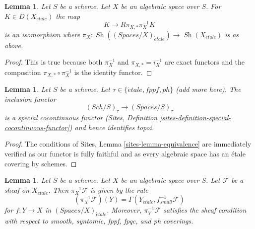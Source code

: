 \documentclass{stacks-project}
\theoremstyle{plain}
\newtheorem{lemma}[subsection]{Lemma}
\theoremstyle{definition}
\theoremstyle{remark}
\numberwithin{equation}{subsection}
\def\Sch{\mathit{Sch}}
\def\Sh{\mathop{\mathit{Sh}}\nolimits}
\def\etale{{\acute{e}tale}}
\begin{document}
\begin{lemma}
\label{lemma-cohomological-descent-etale}
Let $S$ be a scheme. Let $X$ be an algebraic space over $S$.
For $K \in D(X_\etale)$ the map
$$
K \longrightarrow R\pi_{X, *}\pi_X^{-1}K
$$
is an isomorphism where
$\pi_X : \Sh((\textit{Spaces}/X)_\etale) \to \Sh(X_\etale)$ is as above.
\end{lemma}

\begin{proof}
This is true because both $\pi_X^{-1}$ and $\pi_{X, *} = i_X^{-1}$
are exact functors and the composition $\pi_{X, *} \circ \pi_X^{-1}$
is the identity functor.
\end{proof}

\begin{lemma}
\label{lemma-compare-cohomology-other-topologies}
Let $S$ be a scheme. Let $\tau \in \{\etale, fppf, ph\}$ (add more here).
The inclusion functor
$$
(\Sch/S)_\tau \longrightarrow (\textit{Spaces}/S)_\tau
$$
is a special cocontinuous functor
(Sites, Definition \ref{sites-definition-special-cocontinuous-functor})
and hence identifies topoi.
\end{lemma}

\begin{proof}
The conditions of Sites, Lemma \ref{sites-lemma-equivalence}
are immediately verified as our functor is fully faithful
and as every algebraic space has an \'etale covering by schemes.
\end{proof}

\begin{lemma}
\label{lemma-describe-pullback}
Let $S$ be a scheme. Let $X$ be an algebraic space over $S$.
Let $\mathcal{F}$ be a sheaf on $X_\etale$. Then
$\pi_X^{-1}\mathcal{F}$ is given by the rule
$$
(\pi_X^{-1}\mathcal{F})(Y) = \Gamma(Y_\etale, f_{small}^{-1}\mathcal{F})
$$
for $f : Y \to X$ in $(\textit{Spaces}/X)_\etale$.
Moreover, $\pi_Y^{-1}\mathcal{F}$ satisfies the
sheaf condition with respect to smooth, syntomic, fppf, fpqc, and ph coverings.
\end{lemma}
\end{document}
